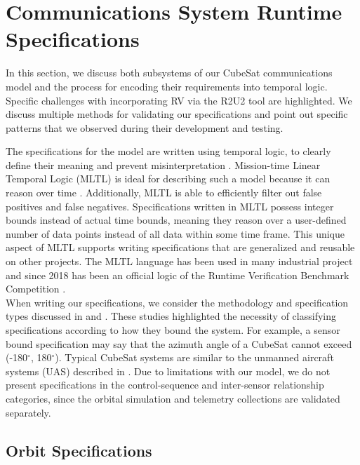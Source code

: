 \documentclass[conf]{new-aiaa}
\begin{document}
\section{Communications System Runtime Specifications}

In this section, we discuss both subsystems of our CubeSat communications model and the process for encoding their requirements into temporal logic. Specific challenges with incorporating RV via the R2U2 tool are highlighted. We discuss multiple methods for validating our specifications and point out specific patterns that we observed during their development and testing.

The specifications for the model are written using temporal logic, to clearly define their meaning and prevent misinterpretation \cite{Roz16}. Mission-time Linear Temporal Logic (MLTL) is ideal for describing such a model because it can reason over time \cite{RRS14,LVR19,LR18}. Additionally, MLTL is able to efficiently filter out false positives and false negatives. Specifications written in MLTL possess integer bounds instead of actual time bounds, meaning they reason over a user-defined number of data points instead of all data within some time frame. This unique aspect of MLTL supports writing specifications that are generalized and reusable on other projects. The MLTL language has been used in many industrial project and since 2018 has been an official logic of the Runtime Verification Benchmark Competition \cite{RRS14,GRS14,SRRMMI15,RSI15,SMR15,SMR16,MRS17,RVBC2018}.\\

When writing our specifications, we consider the methodology and specification types discussed in \cite{Roz16} and \cite{Cauwels2020}. These studies highlighted the necessity of classifying specifications according to how they bound the system. For example, a sensor bound specification may say that the azimuth angle of a CubeSat cannot exceed (-180$^{\circ}$, 180$^{\circ}$). Typical CubeSat systems are similar to the unmanned aircraft systems (UAS) described in \cite{Cauwels2020}. Due to limitations with our model, we do not present specifications in the control-sequence and inter-sensor relationship categories, since the orbital simulation and telemetry collections are validated separately.

\subsection{Orbit Specifications}
\end{document}
